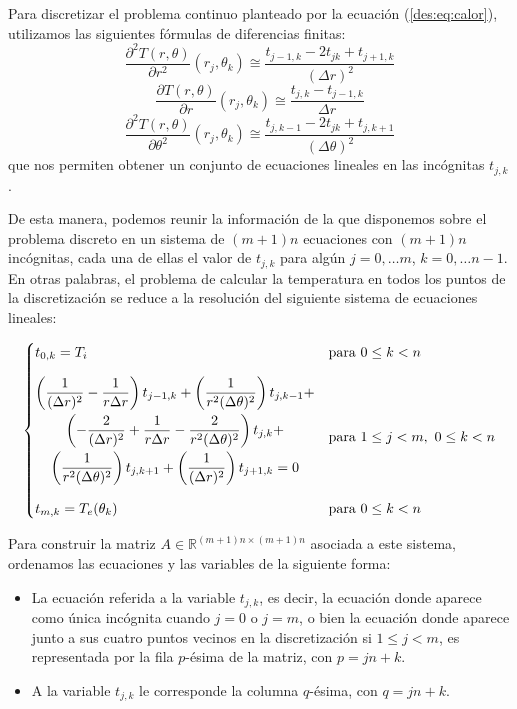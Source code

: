     Para discretizar el problema continuo planteado por la ecuación (\ref{des:eq:calor}), utilizamos las siguientes fórmulas de diferencias finitas:
    \[ \frac{\partial^2 T(r, \theta)}{\partial r^2}(r_j, \theta_k) \cong \frac{t_{j-1,k} - 2 t_{jk} + t_{j+1,k}}{(\Delta r)^2} \]
    \[ \frac{\partial T(r, \theta)}{\partial r}(r_j, \theta_k) \cong \frac{t_{j,k} - t_{j-1,k}}{\Delta r} \]
    \[ \frac{\partial^2 T(r, \theta)}{\partial \theta^2}(r_j, \theta_k) \cong \frac{t_{j,k-1} - 2 t_{jk} + t_{j,k+1}}{(\Delta \theta)^2} \]
    que nos permiten obtener un conjunto de ecuaciones lineales en las incógnitas $t_{j,k}$.

    De esta manera, podemos reunir la información de la que disponemos sobre el problema discreto en un sistema de $(m+1)n$ ecuaciones con $(m+1)n$ incógnitas, cada una de ellas el valor de $t_{j,k}$ para algún $j = 0, \dots m$, $k = 0, \dots n-1$. En otras palabras, el problema de calcular la temperatura en todos los puntos de la discretización se reduce a la resolución del siguiente sistema de ecuaciones lineales:

    \begin{equation} \label{des:eq:sistema}
      \begin{cases}
      \setlength{\jot}{2em}
        t_{0,k} = T_i
          & \text{para } 0 \leq k < n \\[1em]
        \begin{gathered}
          \left( \frac{1}{(\Delta r)^2} - \frac{1}{r \Delta r} \right) t_{j-1,k} +
            \left( \frac{1}{r^2(\Delta \theta)^2} \right) t_{j,k-1} + \\
            \left( - \frac{2}{(\Delta r)^2} + \frac{1}{r \Delta r} - \frac{2}{r^2(\Delta \theta)^2} \right) t_{j,k} + \\
            \left( \frac{1}{r^2(\Delta \theta)^2} \right) t_{j,k+1} +
            \left( \frac{1}{(\Delta r)^2} \right) t_{j+1,k} = 0 \\[1em]
          \end{gathered}
          & \text{para } 1 \leq j < m,\ 0 \leq k < n \\
        t_{m,k} = T_e(\theta_k)
          & \text{para } 0 \leq k < n \\
      \end{cases}
    \end{equation}

    Para construir la matriz $A \in \mathbb{R}^{(m+1)n \times (m+1)n}$ asociada a este sistema, ordenamos las ecuaciones y las variables de la siguiente forma:
    \begin{itemize}
      \item La ecuación referida a la variable $t_{j,k}$, es decir, la ecuación donde aparece como única incógnita cuando $j = 0$ o $j = m$, o bien la ecuación donde aparece junto a sus cuatro puntos vecinos en la discretización si $1 \leq j < m$, es representada por la fila $p$-ésima de la matriz, con $p = jn+k$.
      \item A la variable $t_{j,k}$ le corresponde la columna $q$-ésima, con $q = jn+k$.
    \end{itemize}

